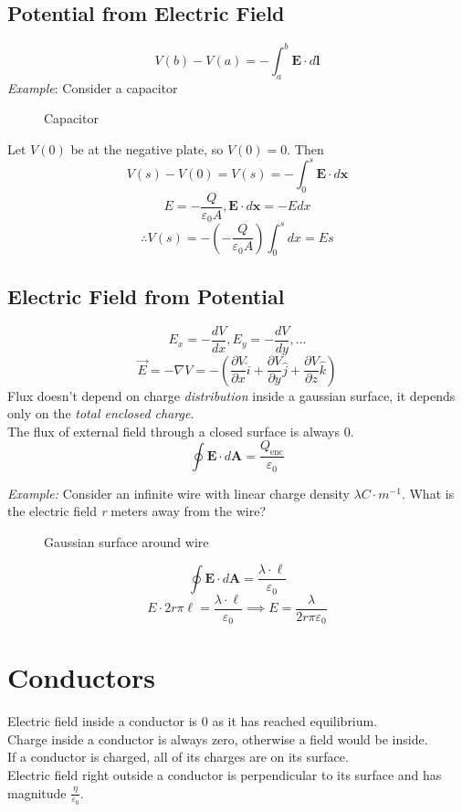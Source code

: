 \subsection{Potential from Electric Field}
$$V(b) - V(a)=-\int_a^b\mathbf{E}\cdot d\mathbf{l}$$
\emph{Example}:
Consider a capacitor
\begin{figure}[H]
    \centering
    
    \caption{Capacitor}
\end{figure}
Let $V(0)$ be at the negative plate, so $V(0)=0$. Then
$$V(s)-V(0)=V(s)=-\int_0^s\mathbf{E}\cdot d\mathbf{x}$$
$$E=-\frac{Q}{\varepsilon_0A},\mathbf{E}\cdot d\mathbf{x}=-Edx$$
$$\therefore V(s)=-(-\frac{Q}{\varepsilon_0A})\int_0^sdx=Es$$
\subsection{Electric Field from Potential}
$$E_x=-\frac{dV}{dx}, E_y=-\frac{dV}{dy},...$$
$$\Vec{E}=-\nabla V=-(\frac{\partial V}{\partial x}\hat{i}+\frac{\partial V}{\partial y}\hat{j}+\frac{\partial V}{\partial z}\hat{k})$$
Flux doesn’t depend on charge \emph{distribution} inside a gaussian surface, it depends only on the \emph{total enclosed charge}.\\
The flux of external field through a closed surface is always 0. 
$$\oint\mathbf{E}\cdot d\mathbf{A}=\frac{Q_{\text{enc}}}{\varepsilon_0}$$

\emph{Example:}
Consider an infinite wire with linear charge density $\lambda C\cdot m^{-1}$. What is the electric field \emph{r} meters away from the wire?
\begin{figure}[H]
    \centering
    
    \caption{Gaussian surface around wire}
\end{figure}
$$\oint\mathbf{E}\cdot d\mathbf{A}=\frac{\lambda\cdot\ell}{\varepsilon_0}$$
$$E\cdot{2r\pi\ell}=\frac{\lambda\cdot\ell}{\varepsilon_0}\implies E=\frac{\lambda}{2r\pi\varepsilon_0}$$
\section{Conductors}
Electric field inside a conductor is 0 as it has reached equilibrium.\\
Charge inside a conductor is always zero, otherwise a field would be inside.\\
If a conductor is charged, all of its charges are on its surface.\\
Electric field right outside a conductor is perpendicular to its surface and has magnitude $\frac{\eta}{\varepsilon_0}$.
